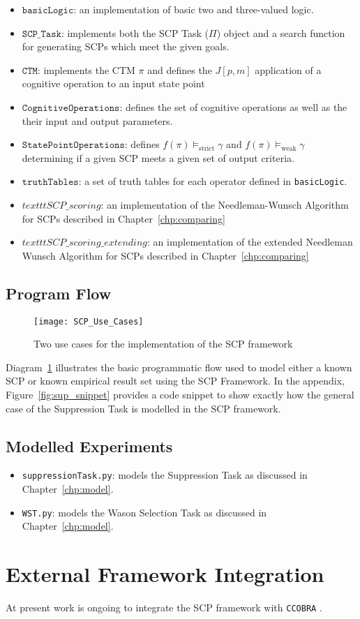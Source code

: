 \begin{itemize}
\item $\texttt{basicLogic}$: an implementation of basic two and three-valued logic.
\item $\texttt{SCP\_Task}$: implements both the SCP Task ($\Pi$) object and a search function for generating SCPs which meet the given goals.
\item $\texttt{CTM}$: implements the CTM $\pi$ and defines the $J[p,m]$ application of a cognitive operation to an input state point
\item $\texttt{CognitiveOperations}$: defines the set of cognitive operations as well as the their input and output parameters.
\item $\texttt{StatePointOperations}$: defines $f(\pi) \models_\text{strict} \gamma$ and $f(\pi) \models_\text{weak} \gamma$ determining if a given SCP meets a given set of output criteria.
\item $\texttt{truthTables}$: a set of truth tables for each operator defined in \texttt{basicLogic}.
\item $texttt{SCP\_scoring}$: an implementation of the Needleman-Wunsch Algorithm for SCPs described in Chapter~\ref{chp:comparing}
\item $texttt{SCP\_scoring\_extending}$: an implementation of the extended Needleman Wunsch Algorithm for SCPs described in Chapter~\ref{chp:comparing}
\end{itemize}

\subsection{Program Flow}
\begin{figure}
\centering \texttt{[image: SCP\_Use\_Cases]}
\caption{Two use cases for the implementation of the SCP framework}
\label{fig:SCP_Use_Cases}
\end{figure}



Diagram~\ref{fig:SCP_Use_Cases} illustrates the basic programmatic flow used to model either a known SCP or known empirical result set using the SCP Framework. In the appendix, Figure~\ref{fig:sup_snippet} provides a code snippet to show exactly how the general case of the Suppression Task is modelled in the SCP framework.



\subsection{Modelled Experiments}
\begin{itemize}
\item \texttt{suppressionTask.py}: models the Suppression Task as discussed in Chapter~\ref{chp:model}.
\item \texttt{WST.py}: models the Wason Selection Task as discussed in Chapter~\ref{chp:model}.
\end{itemize}

\section{External Framework Integration}
At present work is ongoing to integrate the SCP framework with \texttt{CCOBRA} \citep{ccobra}.













